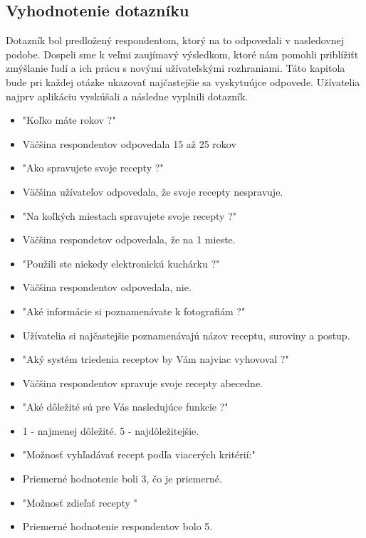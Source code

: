 \documentclass[12pt,a4paper,titlepage,final]{article}
\begin{document}
\subsection{Vyhodnotenie dotazníku}
Dotazník bol predložený respondentom, ktorý na to odpovedali v nasledovnej podobe. Dospeli sme k veľmi zaujímavý výsledkom, ktoré nám pomohli priblížiťt zmýšlanie ľudí a ich prácu s novými užívateľskými rozhraniami. Táto kapitola bude pri každej otázke ukazovať najčastejšie sa vyskytuújce odpovede. Užívatelia najprv aplikáciu vyskúšali a následne vyplnili dotazník.
\begin{itemize}
\item "Koľko máte rokov ?"
\item Väčšina respondentov odpovedala 15 až 25 rokov



\item "Ako spravujete svoje recepty ?"
\item Väčšina užívateľov odpovedala, že svoje recepty nespravuje. 

\item "Na koľkých miestach spravujete svoje recepty ?"
\item Väčšina respondetov odpovedala, že na 1 mieste.


\item "Použili ste niekedy elektronickú kuchárku ?"
 \item Väčšina  respondentov odpovedala, nie.

\item "Aké informácie si poznamenávate k fotografiám ?"
  \item Užívatelia si najčastejšie poznamenávajú názov receptu, suroviny a postup.
  
\item "Aký systém triedenia receptov by Vám najviac vyhovoval ?"
\item Väčšina respondentov spravuje svoje recepty abecedne.

\item "Aké dôležité sú pre Vás nasledujúce funkcie ?"
\item 1 - najmenej dôležité. 5  - najdôležitejšie.
\item "Možnosť vyhľadávať recept podľa viacerých kritérií:"
\item Priemerné hodnotenie boli 3, čo je priemerné.

\item "Možnosť zdieľať recepty	"
\item Priemerné hodnotenie respondentov bolo 5.


\end{itemize}
\end{document}
